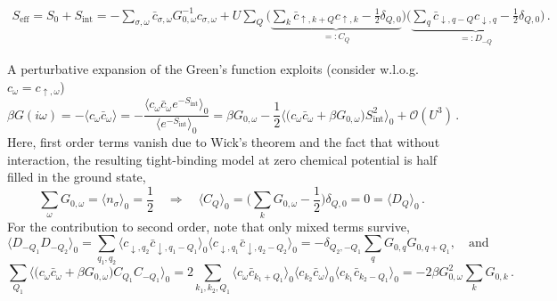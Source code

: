 \documentclass[11pt]{article}
\begin{document}
%
\begin{gather*}
S_{\text{eff}} = S_0 + S_{\text{int}} =
	 - \sum_{\sigma, \omega} \bar{c}_{\sigma, \omega} G_{0, \omega}^{-1}
	c_{\sigma, \omega} 
	+ U \sum_{Q} \Big( 
	\underbrace{
	\sum_{k} \bar{c}_{\uparrow,k+Q} c_{\uparrow,k} - \frac{1}{2} \delta_{Q,0} 
	}_{ =: C_Q}
	\Big) \Big(
	\underbrace{
	\sum_{q} \bar{c}_{\downarrow,q-Q} c_{\downarrow,q} - \frac{1}{2} \delta_{Q,0}
	}_{ =: D_{-Q}}
	\Big)
\, .
\end{gather*}

A perturbative expansion of the Green's function exploits (consider w.l.o.g. $c_{\omega} = c_{\uparrow, \omega}$) 
%
\begin{equation*}
\beta G(i\omega) = - \langle c_{\omega} \bar{c}_{\omega} \rangle
	= - \frac{\langle c_{\omega} \bar{c}_{\omega} e^{-S_{\text{int}}} \rangle_0}
	{\langle e^{-S_{\text{int}}} \rangle_0}
	= \beta G_{0, \omega} - \frac{1}{2} \langle 
	\big( c_{\omega} \bar{c}_{\omega} + \beta G_{0, \omega} \big)
	 S_{\text{int}}^2 \rangle_0 + \mathcal{O}(U^3)
\, .
\end{equation*}
%
Here, first order terms vanish due to Wick's theorem and the fact that without interaction, the resulting tight-binding model at zero chemical potential is half filled in the ground state,
%
\begin{equation*}
\sum_{\omega} G_{0, \omega} = \langle n_{\sigma} \rangle_0 = \frac{1}{2}
\quad
\Rightarrow
\quad
\langle C_Q \rangle_0 =  \big( \sum_{k} G_{0, \omega} - \frac{1}{2} \big) \delta_{Q,0} = 0
	= \langle D_Q \rangle_0
\, .
\end{equation*}
%
For the contribution to second order, note that only mixed terms survive,
%
\begin{equation*}
\langle D_{-Q_1} D_{-Q_2} \rangle_0
	= \sum_{q_1, q_2}
		\langle c_{\downarrow,q_2} \bar{c}_{\downarrow,q_1-Q_1} \rangle_0
		\langle c_{\downarrow,q_1} \bar{c}_{\downarrow,q_2-Q_2} \rangle_0
	= - \delta_{Q_2, -Q_1} \sum_{q} G_{0,q}G_{0,q+Q_1},
\quad
\text{and}
\end{equation*}
%
\begin{equation*}
\sum_{Q_1} \langle \big( c_{\omega} \bar{c}_{\omega}  +  \beta G_{0, \omega} \big) C_{Q_1} C_{-Q_1} \rangle_0 
	= 2 \sum_{k_1, k_2, Q_1}
		\langle c_{\omega} \bar{c}_{k_1+Q_1} \rangle_0
		\langle c_{k_2} \bar{c}_{\omega} \rangle_0
		\langle c_{k_1} \bar{c}_{k_2-Q_1} \rangle_0
	= -2 \beta G_{0,\omega}^2 \sum_k G_{0,k}
\, .
\end{equation*}
\end{document}

